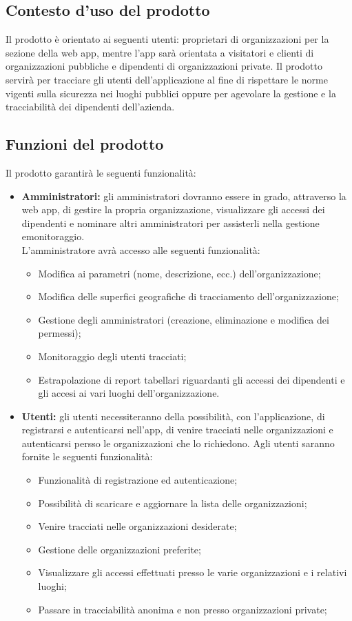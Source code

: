 \subsection{Contesto d'uso del prodotto}
Il prodotto è orientato ai seguenti utenti: proprietari di organizzazioni per la sezione della web app, mentre l'app sarà orientata a visitatori e clienti di organizzazioni pubbliche e dipendenti di organizzazioni private.
Il prodotto servirà per tracciare gli utenti dell'applicazione al fine di rispettare le norme vigenti sulla sicurezza nei luoghi pubblici oppure per agevolare la gestione e la tracciabilità dei dipendenti dell'azienda.

\subsection{Funzioni del prodotto}
Il prodotto garantirà le seguenti funzionalità:
\begin{itemize}
    \item \textbf{Amministratori:} gli amministratori dovranno essere in grado, attraverso la web app, di gestire la propria organizzazione, visualizzare gli accessi dei dipendenti e nominare altri amministratori per assisterli nella gestione emonitoraggio. \\
        L'amministratore avrà accesso alle seguenti funzionalità:
        \begin{itemize}
            \item Modifica ai parametri (nome, descrizione, ecc.) dell'organizzazione;
            \item Modifica delle superfici geografiche di tracciamento dell'organizzazione;
            \item Gestione degli amministratori (creazione, eliminazione e modifica dei permessi);
            \item Monitoraggio degli utenti tracciati;
            \item Estrapolazione di report tabellari riguardanti gli accessi dei dipendenti e gli accesi ai vari luoghi dell'organizzazione.
        \end{itemize}
    \item \textbf{Utenti:} gli utenti necessiteranno della possibilità, con l'applicazione, di registrarsi e autenticarsi nell'app, di venire tracciati nelle organizzazioni e autenticarsi persso le organizzazioni che lo richiedono. Agli utenti saranno fornite le seguenti funzionalità:
    \begin{itemize}
        \item Funzionalità di registrazione ed autenticazione;
        \item Possibilità di scaricare e aggiornare la lista delle organizzazioni;
        \item Venire tracciati nelle organizzazioni desiderate;
        \item Gestione delle organizzazioni preferite;
        \item Visualizzare gli accessi effettuati presso le varie organizzazioni e i relativi luoghi;
        \item Passare in tracciabilità anonima e non presso organizzazioni private;
    \end{itemize}
\end{itemize}

